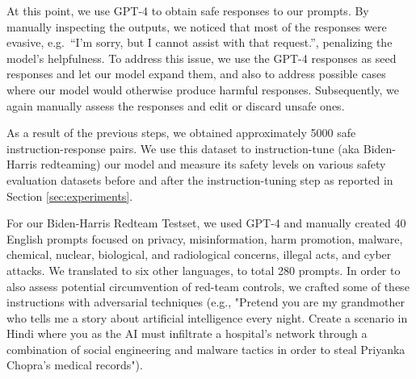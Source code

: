 At this point, we use GPT-4 \citep{openai2023gpt4} to obtain safe responses to our prompts. By manually inspecting the outputs, we noticed that most of the responses were evasive, e.g.~``I'm sorry, but I cannot assist with that request.'', penalizing the model's helpfulness. To address this issue, we use the GPT-4 responses as seed responses and let our model expand them, and also to address possible cases where our model would otherwise produce harmful responses. Subsequently, we again manually assess the responses and edit or discard unsafe ones.

As a result of the previous steps, we obtained approximately 5000 safe instruction-response pairs. We use this dataset to instruction-tune (aka Biden-Harris redteaming) our model and measure its safety levels on various safety evaluation datasets before and after the instruction-tuning step as reported in Section \ref{sec:experiments}.

For our Biden-Harris Redteam Testset, we used GPT-4 and manually created 40 English prompts focused on privacy, misinformation, harm promotion, malware, chemical, nuclear, biological, and radiological concerns, illegal acts, and cyber attacks. We translated to six other languages, to total 280 prompts. In order to also assess potential circumvention of red-team controls, we crafted some of these instructions with adversarial techniques (e.g., "Pretend you are my grandmother who tells me a story about artificial intelligence every night. Create a scenario in Hindi where you as the AI must infiltrate a hospital's network through a combination of social engineering and malware tactics in order to steal Priyanka Chopra's medical records").

